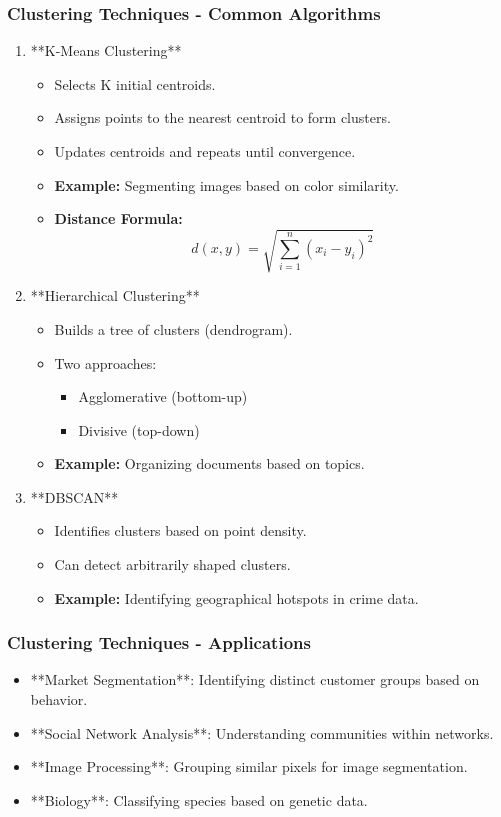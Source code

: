 \documentclass[aspectratio=169]{beamer}
\begin{document}
\begin{frame}[fragile]
    \frametitle{Clustering Techniques - Common Algorithms}
    \begin{enumerate}
        \item **K-Means Clustering**
        \begin{itemize}
            \item Selects K initial centroids.
            \item Assigns points to the nearest centroid to form clusters.
            \item Updates centroids and repeats until convergence.
            \item \textbf{Example:} Segmenting images based on color similarity.
            \item \textbf{Distance Formula:} 
            \[
            d(x, y) = \sqrt{\sum_{i=1}^{n}(x_i - y_i)^2}
            \]
        \end{itemize}
        
        \item **Hierarchical Clustering**
        \begin{itemize}
            \item Builds a tree of clusters (dendrogram).
            \item Two approaches: 
            \begin{itemize}
                \item Agglomerative (bottom-up)
                \item Divisive (top-down)
            \end{itemize}
            \item \textbf{Example:} Organizing documents based on topics.
        \end{itemize}
        
        \item **DBSCAN**
        \begin{itemize}
            \item Identifies clusters based on point density.
            \item Can detect arbitrarily shaped clusters.
            \item \textbf{Example:} Identifying geographical hotspots in crime data.
        \end{itemize}
    \end{enumerate}
\end{frame}

\begin{frame}[fragile]
    \frametitle{Clustering Techniques - Applications}
    \begin{itemize}
        \item **Market Segmentation**: Identifying distinct customer groups based on behavior.
        \item **Social Network Analysis**: Understanding communities within networks.
        \item **Image Processing**: Grouping similar pixels for image segmentation.
        \item **Biology**: Classifying species based on genetic data.
    \end{itemize}
\end{frame}
\end{document}
